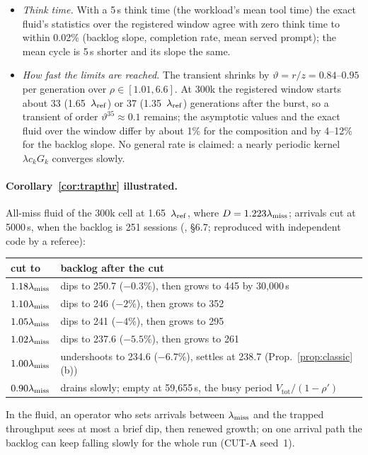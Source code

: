 \begin{itemize}[leftmargin=*,nosep]
Dong~\citep{dong2022metastability}; and within-request KV growth under continuous batching is analysed by Ao et
al.~\citep{ao2026service}, a different instability.
\item \emph{Think time.} With a 5\,s think time (the workload's mean tool time) the exact fluid's statistics over the registered
window agree with zero think time to within 0.02\% (backlog slope, completion rate, mean served prompt); the mean cycle
is 5\,s shorter and its slope the same.
\item \emph{How fast the limits are reached.} The transient shrinks by $\vartheta=r/z=0.84$--$0.95$ per generation over
$\rho\in[1.01,6.6]$. At 300k the registered window starts about 33 (1.65~$\lambda_{\mathrm{ref}}$) or 37 (1.35~$\lambda_{\mathrm{ref}}$) generations after the
burst, so a transient of order $\vartheta^{35}\approx0.1$ remains; the asymptotic values and the exact fluid over the window
differ by about 1\% for the composition and by 4--12\% for the backlog slope. No general rate is claimed: a nearly periodic kernel
$\lambda c_kG_k$ converges slowly.
\end{itemize}

\paragraph{Corollary~\ref{cor:trapthr} illustrated.} All-miss fluid of the 300k cell at 1.65~$\lambda_{\mathrm{ref}}$, where
$D=1.223\lambda_{\mathrm{miss}}$; arrivals cut at 5000\,s, when the backlog is 251 sessions (, \S6.7; reproduced
with independent code by a referee):
\begin{center}\footnotesize
\begin{tabular}{@{}l l@{}}
\toprule
cut to & backlog after the cut\\
\midrule
$1.18\lambda_{\mathrm{miss}}$ & dips to 250.7 ($-0.3$\%), then grows to 445 by 30{,}000\,s\\
$1.10\lambda_{\mathrm{miss}}$ & dips to 246 ($-2$\%), then grows to 352\\
$1.05\lambda_{\mathrm{miss}}$ & dips to 241 ($-4$\%), then grows to 295\\
$1.02\lambda_{\mathrm{miss}}$ & dips to 237.6 ($-5.5$\%), then grows to 261\\
$1.00\lambda_{\mathrm{miss}}$ & undershoots to 234.6 ($-6.7$\%), settles at 238.7 (Prop.~\ref{prop:classic}(b))\\
$0.90\lambda_{\mathrm{miss}}$ & drains slowly; empty at 59{,}655\,s, the busy period $V_{\mathrm{tot}}/(1-\rho')$\\
\bottomrule
\end{tabular}
\end{center}
In the fluid, an operator who sets arrivals between $\lambda_{\mathrm{miss}}$ and the trapped throughput sees at most a brief dip, then renewed
growth; on one arrival path the backlog can keep falling slowly for the whole run (CUT-A seed~1).


